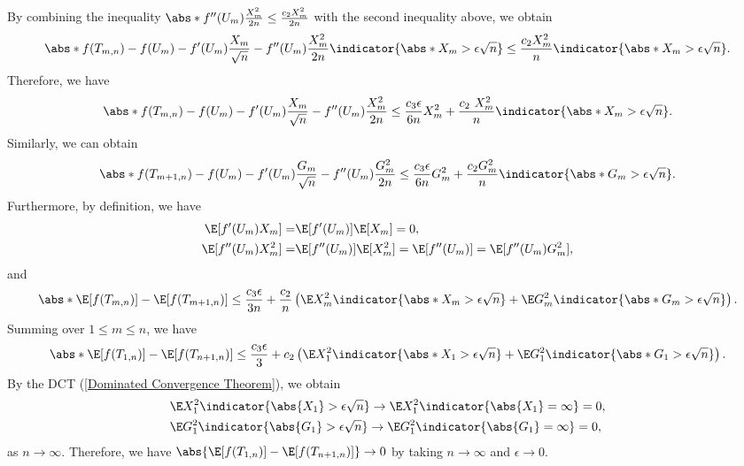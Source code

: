 \documentclass[../aipt.tex]{subfiles}
\begin{document}
By combining the inequality $\abs*{f''(U_m)\frac{X_m^2}{2n}} \leq \frac{c_2 X_m^2}{2n}$ with the second inequality above, we obtain
\begin{align*}
\abs*{f(T_{m,n}) - f(U_m) - f'(U_m)\frac{X_m}{\sqrt{n}} - f''(U_m)\frac{X_m^2}{2n}} \indicator{\abs*{X_m} > \epsilon \sqrt{n}}
\leq
\frac{c_2 X_m^2}{n} \indicator{\abs*{X_m} > \epsilon \sqrt{n}}.
\end{align*}
Therefore, we have
\begin{align*}
\abs*{f(T_{m,n}) - f(U_m) - f'(U_m)\frac{X_m}{\sqrt{n}} - f''(U_m)\frac{X_m^2}{2n}}
\leq
\frac{c_3\epsilon}{6n}X_m^2 + \frac{c_2\ X_m^2}{n} \indicator{\abs*{X_m} > \epsilon \sqrt{n}}.
\end{align*}
Similarly, we can obtain
\begin{align*}
\abs*{f(T_{m+1,n}) - f(U_m) - f'(U_m)\frac{G_m}{\sqrt{n}} - f''(U_m)\frac{G_m^2}{2n}}
\leq
\frac{c_3\epsilon}{6n}G_m^2 + \frac{c_2 G_m^2}{n} \indicator{\abs*{G_m} > \epsilon \sqrt{n}}.
\end{align*}
Furthermore,  by definition, we have
\begin{align*}
\E[f'(U_m)X_m] =& \E[f'(U_m)] \E[X_m] = 0, \\
\E[f''(U_m)X_m^2] =& \E[f''(U_m)] \E[X_m^2] = \E[f''(U_m)] = \E[f''(U_m)G_m^2],
\end{align*}
and
\begin{align*}
\abs*{ \E[f(T_{m,n})] - \E[f(T_{m+1,n})] } 
\leq
\frac{c_3\epsilon}{3n} + \frac{c_2}{n} \left( \E X_m^2 \indicator{\abs*{X_m} > \epsilon \sqrt{n}} +  \E G_m^2 \indicator{\abs*{G_m} > \epsilon \sqrt{n}} \right).
\end{align*}
Summing over $1\leq m \leq n$, we have
\begin{align*}
\abs*{\E[f(T_{1,n})] - \E[f(T_{n+1,n})]}
\leq
\frac{c_3\epsilon}{3} + c_2\left( \E X_1^2 \indicator{\abs*{X_1} > \epsilon \sqrt{n}} +  \E G_1^2 \indicator{\abs*{G_1} > \epsilon \sqrt{n}} \right).
\end{align*}
By the DCT (\cref{Dominated Convergence Theorem}), we obtain
\begin{align*}
&\E X_1^2 \indicator{\abs{X_1} > \epsilon \sqrt{n}} \to \E X_1^2 \indicator{\abs{X_1} = \infty} =0,\\
&\E G_1^2 \indicator{\abs{G_1} > \epsilon \sqrt{n}} \to \E G_1^2 \indicator{\abs{G_1} = \infty} =0,
\end{align*}
as $n \to \infty$. Therefore, we have $\abs{\E[f(T_{1,n})] - \E[f(T_{n+1,n})]}\to 0$ by taking $n\to\infty$ and $\epsilon\to0$.
\end{document}
